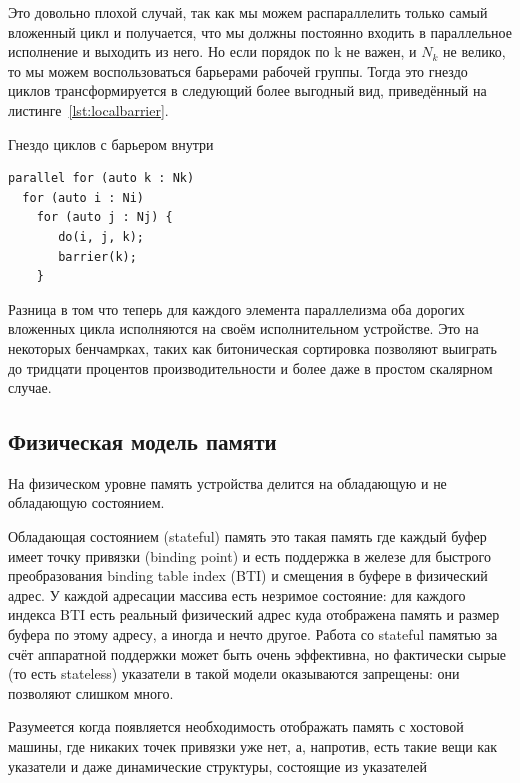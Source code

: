 Это довольно плохой случай, так как мы можем распараллелить только самый вложенный цикл и получается, что мы должны постоянно входить в параллельное исполнение и выходить из него. Но если порядок по k не важен, и $N_k$ не велико, то мы можем воспользоваться барьерами рабочей группы. Тогда это гнездо циклов трансформируется в следующий более выгодный вид, приведённый на листинге~\cref{lst:localbarrier}.

\begin{ListingEnv}[!h]
    \captiondelim{ } 
    \caption{Гнездо циклов с барьером внутри}\label{lst:localbarrier}
    \begin{lstlisting}[language={[ISO]C++}]
parallel for (auto k : Nk)
  for (auto i : Ni)
    for (auto j : Nj) {
       do(i, j, k);
       barrier(k);
    }
    \end{lstlisting}
\end{ListingEnv}

Разница в том что теперь для каждого элемента параллелизма оба дорогих вложенных цикла исполняются на своём исполнительном устройстве. Это на некоторых бенчамрках, таких как битоническая сортировка позволяют выиграть до тридцати процентов производительности и более даже в простом скалярном случае.

\subsection{Физическая модель памяти}\label{subsec:overview/logical/physmem}

На физическом уровне память устройства делится на обладающую и не обладающую состоянием.

Обладающая состоянием (stateful) память это такая память где каждый буфер имеет точку привязки (binding point) и есть поддержка в железе для быстрого преобразования binding table index (BTI) и смещения в буфере в физический адрес. У каждой адресации массива есть незримое состояние: для каждого индекса BTI есть реальный физический адрес куда отображена память и размер буфера по этому адресу, а иногда и нечто другое. Работа со stateful памятью за счёт аппаратной поддержки может быть очень эффективна, но фактически сырые (то есть stateless) указатели в такой модели оказываются запрещены: они позволяют слишком много.

Разумеется когда появляется необходимость отображать память с хостовой машины, где никаких точек привязки уже нет, а, напротив, есть такие вещи как указатели и даже динамические структуры, состоящие из указателей


